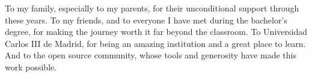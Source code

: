 To my family, especially to my parents, for their unconditional support through these years. To my friends, and to everyone I have met during the bachelor's degree, for making the journey worth it far beyond the classroom. To Universidad Carlos III de Madrid, for being an amazing institution and a great place to learn. And to the open source community, whose tools and generosity have made this work possible.
